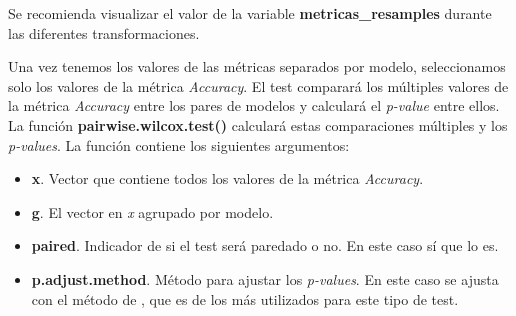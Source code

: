 \documentclass[]{article}
\newenvironment{Shaded}{\begin{snugshade}}{\end{snugshade}}
\newcommand{\DataTypeTok}[1]{\textcolor[rgb]{0.13,0.29,0.53}{#1}}
\newcommand{\KeywordTok}[1]{\textcolor[rgb]{0.13,0.29,0.53}{\textbf{#1}}}
\newcommand{\NormalTok}[1]{#1}
\newcommand{\OperatorTok}[1]{\textcolor[rgb]{0.81,0.36,0.00}{\textbf{#1}}}
\newcommand{\OtherTok}[1]{\textcolor[rgb]{0.56,0.35,0.01}{#1}}
\newcommand{\StringTok}[1]{\textcolor[rgb]{0.31,0.60,0.02}{#1}}
\providecommand{\tightlist}{%
  \setlength{\itemsep}{0pt}\setlength{\parskip}{0pt}}
\begin{document}
Se recomienda visualizar el valor de la variable \textbf{metricas\_resamples} durante las diferentes transformaciones.

\vspace{2mm}

\begin{Shaded}
\end{Shaded}

Una vez tenemos los valores de las métricas separados por modelo, seleccionamos solo los valores de la métrica \emph{Accuracy}. El test comparará los múltiples valores de la métrica \emph{Accuracy} entre los pares de modelos y calculará el \emph{p-value} entre ellos. La función \textbf{pairwise.wilcox.test()} calculará estas comparaciones múltiples y los \emph{p-values}. La función contiene los
siguientes argumentos:

\begin{itemize}
\tightlist
\item
  \textbf{x}. Vector que contiene todos los valores de la métrica \emph{Accuracy}.
\item
  \textbf{g}. El vector en \emph{x} agrupado por modelo.
\item
  \textbf{paired}. Indicador de si el test será paredado o no. En este
  caso sí que lo es.
\item
  \textbf{p.adjust.method}. Método para ajustar los \emph{p-values}. En
  este caso se ajusta con el método de
  \href{https://en.wikipedia.org/wiki/Holm\%E2\%80\%93Bonferroni_method}{\color{blue}{Holm's}},
  que es de los más utilizados para este tipo de test.
\end{itemize}
\end{document}
